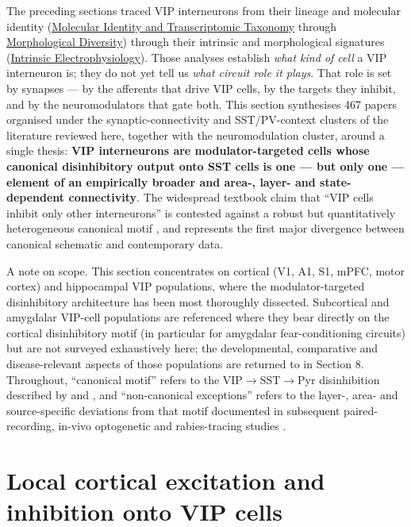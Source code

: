 \documentclass[11pt]{article}
\let\origrightarrow\rightarrow
\def\rightarrow{\ensuremath{\origrightarrow}}
\begin{document}
The preceding sections traced VIP interneurons from their lineage and molecular identity (\href{/classification}{Molecular Identity and Transcriptomic Taxonomy} through \href{/morphology}{Morphological Diversity}) through their intrinsic and morphological signatures (\href{/electrophysiology}{Intrinsic Electrophysiology}). Those analyses establish \textit{what kind of cell} a VIP interneuron is; they do not yet tell us \textit{what circuit role it plays}. That role is set by synapses --- by the afferents that drive VIP cells, by the targets they inhibit, and by the neuromodulators that gate both. This section synthesises 467 papers organised under the synaptic-connectivity and SST/PV-context clusters of the literature reviewed here, together with the neuromodulation cluster, around a single thesis: \textbf{VIP interneurons are modulator-targeted cells whose canonical disinhibitory output onto SST cells is one --- but only one --- element of an empirically broader and area-, layer- and state-dependent connectivity}. The widespread textbook claim that ``VIP cells inhibit only other interneurons'' is contested \citep{Yu2019, Zhou2017, Anastasiades2021a} against a robust but quantitatively heterogeneous canonical motif \citep{Pfeffer2013, Pi2013, Lee2013, Karnani2016a}, and represents the first major divergence between canonical schematic and contemporary data.

A note on scope. This section concentrates on cortical (V1, A1, S1, mPFC, motor cortex) and hippocampal VIP populations, where the modulator-targeted disinhibitory architecture has been most thoroughly dissected. Subcortical and amygdalar VIP-cell populations are referenced where they bear directly on the cortical disinhibitory motif (in particular for amygdalar fear-conditioning circuits) but are not surveyed exhaustively here; the developmental, comparative and disease-relevant aspects of those populations are returned to in Section 8. Throughout, ``canonical motif'' refers to the VIP\rightarrow SST\rightarrow Pyr disinhibition described by \citet{Pfeffer2013} and \citet{Pi2013}, and ``non-canonical exceptions'' refers to the layer-, area- and source-specific deviations from that motif documented in subsequent paired-recording, in-vivo optogenetic and rabies-tracing studies \citep{Yu2019, Zhou2017, Anastasiades2021a, Walker2016, Wall2016, Karnani2016a}.

\setcounter{tocdepth}{2}
\tableofcontents
\section{Local cortical excitation and inhibition onto VIP cells}
\end{document}
